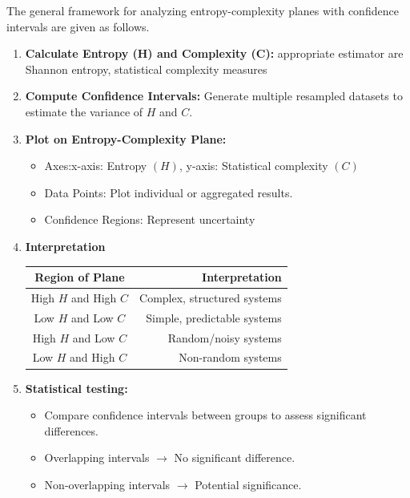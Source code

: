 The general framework for analyzing entropy-complexity planes with confidence intervals are given as follows.
\begin{enumerate}
	\item \textbf{Calculate Entropy (H) and Complexity (C):} 
	appropriate estimator are Shannon entropy, statistical complexity measures 
	\item \textbf{Compute Confidence Intervals:}
	Generate multiple resampled datasets to estimate the variance of $H$ and $C$.
	\item \textbf{Plot on Entropy-Complexity Plane:}
	\begin{itemize}
		\item Axes:x-axis: Entropy $(H)$, y-axis: Statistical complexity $(C)$
		\item Data Points: Plot individual or aggregated results.
		\item Confidence Regions: Represent uncertainty 
	\end{itemize}
	
	\item \textbf{Interpretation}
	\begin{table}[H]
		\centering
		\begin{tabular}{cr}
			\toprule
			Region of Plane  & Interpretation  \\
			\midrule
			High $H$ and High $C$ & Complex, structured systems \\ 
			Low $H$ and Low $C$ & Simple, predictable systems \\
			High $H$ and Low $C$ & Random/noisy systems \\
			Low $H$ and High $C$ & Non-random systems \\ 
			\bottomrule
		\end{tabular}
	\end{table}
	
	\item \textbf{Statistical testing:}
	\begin{itemize}
		\item Compare confidence intervals between groups to assess significant differences.
		\item Overlapping intervals $\rightarrow$ {No significant difference}.
		\item Non-overlapping intervals $\rightarrow$ Potential significance.
	\end{itemize}
\end{enumerate}







